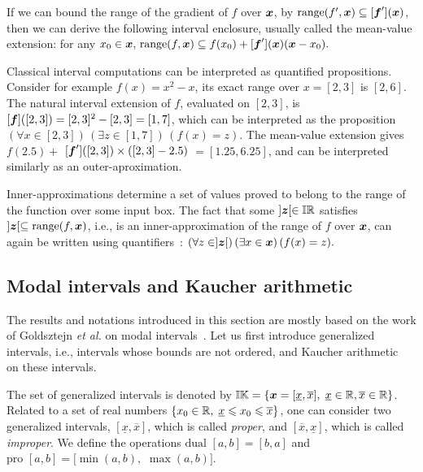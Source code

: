 \documentclass{sig-alternate-05-2015}
\DeclareMathOperator{\range}{range}
\newcommand{\pro}{\mbox{pro }}
\def\bbr{{\Bbb R}}
\def\I{{\Bbb I \Bbb R}}
\def\K{{\Bbb I \Bbb K}}
\begin{document}
If we can bound the range of the gradient of $f$ over $\x$, by $\mbox{range}(f',\x) \subseteq [\f'](\x)$, then we can 
derive the following interval enclosure, usually called the mean-value extension: for any  $x_0 \in \x, \,    \mbox{range}(f,\x)  \subseteq f(x_0) +  [\f'](\x) (\x - x_0). $

Classical interval computations can be interpreted as quantified 
propositions. Consider for example $f(x)=x^2-x$, its exact range over $x=[2,3]$ is $[2,6]$.
The natural interval extension of $f$, evaluated on $[2,3]$, is 
$[\f]([2,3])=[2,3]^2-[2,3]=[1,7]$, which can be interpreted as the proposition 
$ (\forall x \in [2,3]) \, (\exists z \in [1,7]) \, (f(x)=z).    $
The mean-value extension gives
$f(2.5) + $ $[\f']([2, 3]) \times ([2, 3] - 2.5)$ $ = [1.25, 6.25]$, and can be interpreted similarly as an outer-aproximation.

Inner-approximations determine a set of values proved to belong to the range of the function over some input box. 
The fact that some $]\z[ \in \I$ satisfies $]\z[ \subseteq \range(f,\x)$, i.e., is an inner-approximation of the range 
of $f$ over $\x$, can again be written using quantifiers~: 
$ (\forall z \in ]\z[) \, (\exists x \in \x) \, (f(x)=z).    $

\subsection{Modal intervals and Kaucher arithmetic}
\label{Kaucherar}

The results and notations introduced in this section are mostly based on the work of Goldsztejn {\it et al.} 
on modal intervals~\cite{gold1}. 
Let us first introduce generalized intervals, i.e., intervals whose
bounds are not ordered, and Kaucher arithmetic~\cite{Kaucher} on these intervals.  

The set of generalized
intervals is denoted by $\K = \{ \x=[\underline{x},\overline{x}], \; \underline{x} \in \bbr, \overline{x}  \in \bbr\}$.
Related to a set of real numbers $\{x_0 \in \bbr, \;  \underline{x} \leqslant x_0 \leqslant  \overline{x} \}$, one can consider two generalized 
intervals, $[\underline{x},\overline{x}]$, which is called \emph{proper}, and $[\overline{x},\underline{x}]$, which is called 
\emph{improper}. We define the operations $\mbox{dual } [a,b]=[b,a]$ and 
$\pro [a,b]=[\min(a,b),$ $\max(a,b)]$. 
\end{document}
